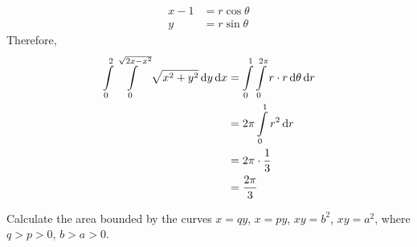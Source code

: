 \documentclass[fleqn, a4paper, 11pt, oneside]{amsart}
\theoremstyle{definition}
\theoremstyle{theorem}
\begin{document}
\begin{solution}
\begin{enumerate}[leftmargin = *]
\begin{align*}
				x - 1 & = r \cos \theta \\
				y     & = r \sin \theta
			\end{align*}
			Therefore,
			\begin{align*}
				\int\limits_{0}^{2} \int\limits_{0}^{\sqrt{2 x - x^2}} \sqrt{x^2 + y^2} \dif y \dif x & = \int\limits_{0}^{1} \int\limits_{0}^{2 \pi} r \cdot r \dif \theta \dif r \\
                                                                                                                      & = 2 \pi \int\limits_{0}^{1} r^2 \dif r                                     \\
                                                                                                                      & = 2 \pi \cdot \frac{1}{3}                                                  \\
                                                                                                                      & = \frac{2 \pi}{3}
			\end{align*}
	\end{enumerate}
\end{solution}

\begin{question}
	Calculate the area bounded by the curves $x = q y$, $x = p y$, $x y = b^2$, $x y = a^2$, where $q > p > 0$, $b > a > 0$.
\end{question}
\end{document}
